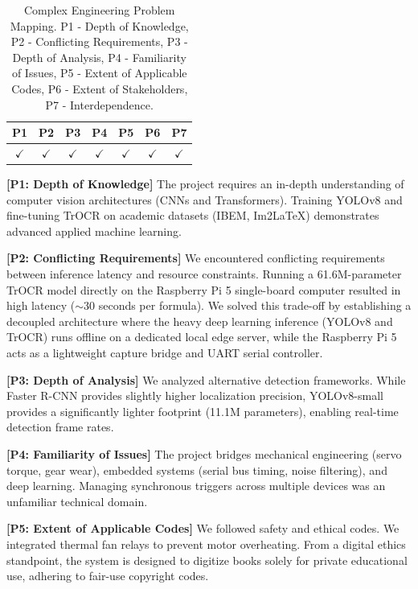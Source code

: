 \documentclass[conference]{IEEEtran}
\begin{document}
\begin{table}[h]
    \begin{center}
    \begin{tabular}{|c|c|c|c|c|c|c|}
\hline  
P1&P2&P3&P4&P5&P6&P7\\
\hline 
$\checkmark$&$\checkmark$&$\checkmark$&$\checkmark$&$\checkmark$&$\checkmark$&$\checkmark$\\
\hline 
\end{tabular}
\end{center}
    \caption{Complex Engineering Problem Mapping. P1 - Depth of Knowledge, P2 - Conflicting Requirements, P3 - Depth of Analysis, P4 - Familiarity of Issues, P5 - Extent of Applicable Codes, P6 - Extent of Stakeholders, P7 - Interdependence.}
    \label{tab:cep}
\end{table}

\noindent \textbf{[P1: Depth of Knowledge]} The project requires an in-depth understanding of computer vision architectures (CNNs and Transformers). Training YOLOv8 and fine-tuning TrOCR on academic datasets (IBEM, Im2LaTeX) demonstrates advanced applied machine learning.

\noindent \textbf{[P2: Conflicting Requirements]} We encountered conflicting requirements between inference latency and resource constraints. Running a 61.6M-parameter TrOCR model directly on the Raspberry Pi 5 single-board computer resulted in high latency ($\sim$30 seconds per formula). We solved this trade-off by establishing a decoupled architecture where the heavy deep learning inference (YOLOv8 and TrOCR) runs offline on a dedicated local edge server, while the Raspberry Pi 5 acts as a lightweight capture bridge and UART serial controller.

\noindent \textbf{[P3: Depth of Analysis]} We analyzed alternative detection frameworks. While Faster R-CNN provides slightly higher localization precision, YOLOv8-small provides a significantly lighter footprint (11.1M parameters), enabling real-time detection frame rates.

\noindent \textbf{[P4: Familiarity of Issues]} The project bridges mechanical engineering (servo torque, gear wear), embedded systems (serial bus timing, noise filtering), and deep learning. Managing synchronous triggers across multiple devices was an unfamiliar technical domain.

\noindent \textbf{[P5: Extent of Applicable Codes]} We followed safety and ethical codes. We integrated thermal fan relays to prevent motor overheating. From a digital ethics standpoint, the system is designed to digitize books solely for private educational use, adhering to fair-use copyright codes.
\end{document}
